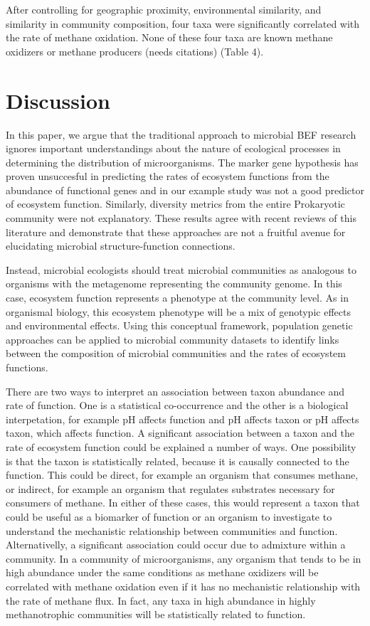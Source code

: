 \documentclass{article}
\begin{document}


After controlling for geographic proximity, environmental similarity, and
similarity in community composition, four taxa were significantly correlated
with the rate of methane oxidation. None of these four taxa are known methane
oxidizers or methane producers (needs citations) (Table 4).



\section{Discussion}

In this paper, we argue that the traditional approach to microbial BEF research
ignores important understandings about the nature of ecological processes in
determining the distribution of microorganisms. The marker gene hypothesis has
proven unsuccesful in predicting the rates of ecosystem functions from the
abundance of functional genes and in our example study was not a good predictor
of ecosystem function.
Similarly, diversity metrics from the entire Prokaryotic community were not
explanatory. These results agree with recent reviews of this literature and
demonstrate that these approaches are not a fruitful avenue for elucidating
microbial structure-function connections. 

Instead, microbial ecologists should treat microbial communities as analogous to
organisms with the metagenome representing the community genome. In this case,
ecosystem function represents a phenotype at the community level. As in
organismal biology, this ecosystem phenotype will be a mix of genotypic effects and
environmental effects. Using this conceptual framework, population genetic
approaches can be applied to microbial community datasets to identify  links
between the composition of microbial communities and the rates of ecosystem
functions.

There are two ways to interpret an association between taxon abundance and rate
of function. One is a statistical co-occurrence and the other is a biological
interpetation, for example pH affects function and pH affects taxon or pH
affects taxon, which affects function.
A significant association between a taxon and the rate of ecosystem function
could be explained a number of ways. One possibility is that the taxon is
statistically related, because it is causally connected to the function. This
could be direct, for example an organism that consumes methane, or indirect, for
example an organism that regulates substrates necessary for consumers of
methane. In either of these cases, this would represent a taxon that could be
useful as a biomarker of function or an organism to investigate to understand
the mechanistic relationship between communities and function. Alternativelly, a significant
association could occur due to admixture within a community. In a community of
microorganisms, any organism that tends to be in high abundance under the same
conditions as methane oxidizers will be correlated with methane oxidation even
if it has no mechanistic relationship with the rate of methane flux. In fact,
any taxa in high abundance in highly methanotrophic communities will be
statistically related to function.
\end{document}
